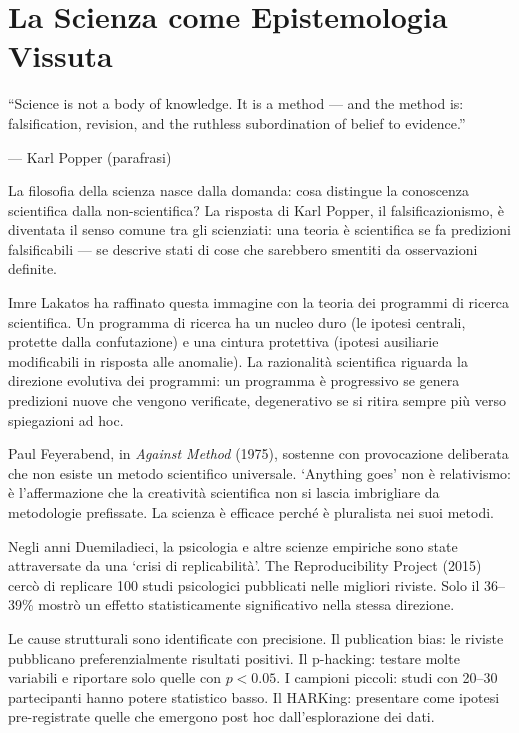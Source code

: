 \documentclass[12pt,a4paper,openany]{book}
\newcommand{\sezione}[1]{\vspace{1.2em}{\large\bfseries #1}\vspace{0.5em}\par}
\begin{document}
\chapter{La Scienza come Epistemologia Vissuta}

\epigraph{``Science is not a body of knowledge. It is a method — and the method is: falsification, revision, and the ruthless subordination of belief to evidence.''}{--- Karl Popper (parafrasi)}

\sezione{Popper, Lakatos, Feyerabend}

La filosofia della scienza nasce dalla domanda: cosa distingue la conoscenza scientifica dalla non-scientifica? La risposta di Karl Popper, il falsificazionismo, è diventata il senso comune tra gli scienziati: una teoria è scientifica se fa predizioni falsificabili — se descrive stati di cose che sarebbero smentiti da osservazioni definite.

Imre Lakatos ha raffinato questa immagine con la teoria dei programmi di ricerca scientifica. Un programma di ricerca ha un nucleo duro (le ipotesi centrali, protette dalla confutazione) e una cintura protettiva (ipotesi ausiliarie modificabili in risposta alle anomalie). La razionalità scientifica riguarda la direzione evolutiva dei programmi: un programma è progressivo se genera predizioni nuove che vengono verificate, degenerativo se si ritira sempre più verso spiegazioni ad hoc.

Paul Feyerabend, in \textit{Against Method} (1975), sostenne con provocazione deliberata che non esiste un metodo scientifico universale. `Anything goes' non è relativismo: è l'affermazione che la creatività scientifica non si lascia imbrigliare da metodologie prefissate. La scienza è efficace perché è pluralista nei suoi metodi.

\sezione{La crisi di replicabilità}

Negli anni Duemiladieci, la psicologia e altre scienze empiriche sono state attraversate da una `crisi di replicabilità'. The Reproducibility Project (2015) cercò di replicare 100 studi psicologici pubblicati nelle migliori riviste. Solo il 36--39\% mostrò un effetto statisticamente significativo nella stessa direzione.

Le cause strutturali sono identificate con precisione. Il publication bias: le riviste pubblicano preferenzialmente risultati positivi. Il p-hacking: testare molte variabili e riportare solo quelle con $p < 0.05$. I campioni piccoli: studi con 20--30 partecipanti hanno potere statistico basso. Il HARKing: presentare come ipotesi pre-registrate quelle che emergono post hoc dall'esplorazione dei dati.
\end{document}

